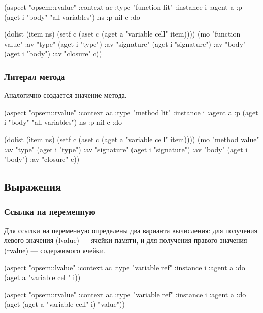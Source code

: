 \documentclass[12pt,twoside,russian]{article}
\begin{document}
\begin{ABMLCode}
(aspect "opsem::rvalue" :context ac :type "function lit" :instance i 
  :agent a :p (aget i "body" "all variables") ns :p nil c :do 
  
  (dolist (item ns) (setf c (aset c (aget a "variable cell" item))))
  (mo "function value" :av "type"      (aget i "type")
                       :av "signature" (aget i "signature")
                       :av "body"      (aget i "body")
                       :av "closure"   c))
\end{ABMLCode}

\subsubsection{Литерал метода}
Аналогично создается значение метода.

\begin{ABMLCode}
(aspect "opsem::rvalue" :context ac :type "method lit" :instance i 
  :agent a :p (aget i "body" "all variables") ns :p nil c :do 
  
  (dolist (item ns) (setf c (aset c (aget a "variable cell" item))))
  (mo "method value"  :av "type"      (aget i "type")
                      :av "signature" (aget i "signature")
                      :av "body"      (aget i "body")
                      :av "closure"   c))
\end{ABMLCode}


\subsection{Выражения}

\subsubsection{Ссылка на переменную}
Для ссылки на переменную определены два варианта вычисления: для получения левого значения (lvalue) — ячейки памяти, и для получения правого значения (rvalue) — содержимого ячейки.

\begin{ABMLCode}
(aspect "opsem::lvalue" :context ac :type "variable ref" :instance i 
  :agent a :do (aget a "variable cell" i))

(aspect "opsem::rvalue" :context ac :type "variable ref" :instance i 
  :agent a :do (aget (aget a "variable cell" i) "value"))
\end{ABMLCode}
\end{document}

